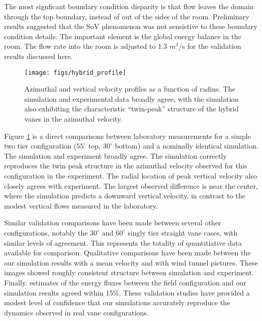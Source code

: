 The most signficant boundary condition disparity is that
flow leaves the domain through the top boundary, instead of out
of the sides of the room. Preliminary results suggested that the SoV phenomenon 
was not sensistive to these boundary condition details. The important element is the 
global energy balance in the room. The flow rate into the room is adjusted to 
1.3 $m^3$/s for the validation results discussed here. 


  \begin{figure}[!htb]
    \begin{center}
     \texttt{[image: figs/hybrid\_profile]}
     \caption{Azimuthal and vertical velocity profiles as a function of
     radius. The simulation and experimental data broadly agree, with
     the simulation also exhibiting the characteristic ``twin-peak''
     structure of the hybrid vanes in the azimuthal velocity. }
     \label{fig:lab}
    \end{center}
  \end{figure}

Figure \ref{fig:lab} is a direct comparisons between laboratory measurements for a simple 
two tier configuration ($55^{\circ}$ top, $30^{\circ}$ bottom) and 
a nominally identical simulation. The simulation and experiment broadly
agree. The simulation correctly reproduces the twin peak structure in
the azimuthal velocity observed for this configuration in the
experiment. The radial location of peak vertical velocity also closely
agrees with experiment. The largest observed difference is near the
center, where the simulation predicts a downward vertical velocity, in
contrast to the modest vertical flows measured in the laboratory.  

Similar validation comparisons have been made between several other
configurations, notably the $30^{\circ}$ and $60^{\circ}$ singly tier
straight vane cases, with similar levels of agreement. This represents
the totality of quantitiative data available for comparison. Qualitative
comparisons have been made between the our simulation results with a
mean velocity and with wind tunnel pictures. These images showed roughly
consistent structure between simulation and
experiment. Finally. estimates of the energy fluxes between the field
configuration and our simulation results agreed within 15\%. These
validation studies have provided a modest level of confidence that our
simulations accurately reproduce the dynamics observed in real vane
configurations. 

